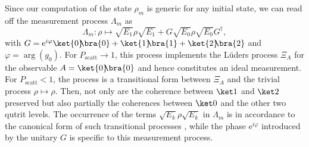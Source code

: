 \documentclass[
aps,prl,
reprint,
a4paper,
superscriptaddress,
floatfix,
]{revtex4-1}
\newcommand{\ee}{{\mathrm e}}
\newcommand{\ketbra}[2]{{\ket{#1}\!\!\bra{#2}}}
\newcommand{\proj}[1]{{\ketbra{#1}{#1}}}
\begin{document}
Since our computation of the state $\rho_m$ is generic for any 
 initial state, we can read off the measurement process $\Lambda_m$ as
%
\begin{equation}\label{eq:lambdam}
 \Lambda_m\colon \rho\mapsto \sqrt{E_1}\rho\sqrt{E_1}
               +G\sqrt{E_0}\rho\sqrt{E_0}G^\dag,
\end{equation}
%
 with $G= \ee^{i \varphi} \proj 0+\proj 1+\proj 2$ and $\varphi=\arg(g_0)$.
For $P_\mathrm{scatt}\rightarrow 1$, this process implements the Lüders process 
 $\Xi_A$ for the observable $A= \proj 0$ and hence constitutes an ideal 
 measurement.
For $P_\mathrm{scatt}<1$, the process is a transitional form between $\Xi_A$ 
 and the trivial process $\rho\mapsto \rho$.
Then, not only are the coherence between $\ket1$ and $\ket2$ preserved but also 
 partially the coherences between $\ket0$ and the other two qutrit levels.
The occurrence of the terms $\sqrt{E_k}\rho\sqrt{E_k}$ in $\Lambda_m$ 
 is in accordance to the canonical form of such transitional processes 
 \cite{Heinosaari12}, while the phase $\ee^{i\varphi}$ introduced by the 
 unitary $G$ is specific to this measurement process.
\end{document}
